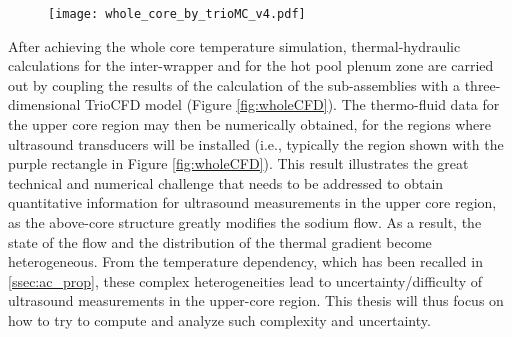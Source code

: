     \begin{figure}[htbp]
        \centerline{\texttt{[image: whole\_core\_by\_trioMC\_v4.pdf]}}
        \label{fig:whole_core_by_trioMC}
    \end{figure}
%
    After achieving the whole core temperature simulation, thermal-hydraulic calculations for the inter-wrapper and for the hot pool plenum zone are carried out by
coupling the results of the calculation of the sub-assemblies with a three-dimensional TrioCFD model (Figure \ref{fig:wholeCFD}). The thermo-fluid data for the
upper core region may then be numerically obtained, for the regions where ultrasound transducers will be installed (i.e., typically
the region shown with the purple rectangle in Figure \ref{fig:wholeCFD}).
This result illustrates the great technical and numerical challenge that needs to be addressed
to obtain quantitative information for ultrasound measurements in the upper core region,
as the above-core structure greatly modifies the sodium flow. As a result, the state of the flow and the distribution of the thermal gradient become heterogeneous.
From the temperature dependency, which has been recalled in \autoref{ssec:ac_prop}, these complex heterogeneities lead to uncertainty/difficulty of ultrasound measurements
in the upper-core region. This thesis will thus focus on how to try to compute and analyze such complexity and uncertainty.

